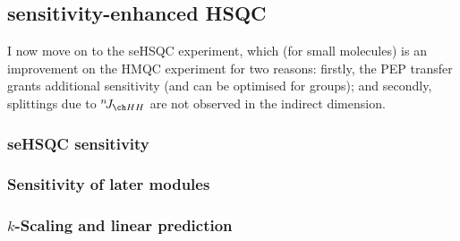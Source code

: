 \subsection{\texorpdfstring{\nitrogen{}}{15N} sensitivity-enhanced HSQC}
\label{subsec:noah__sehsqc_n}

I now move on to the \nitrogen{} seHSQC experiment, which (for small molecules) is an improvement on the HMQC experiment for two reasons: firstly, the PEP transfer grants additional sensitivity (and can be optimised for  groups); and secondly, splittings due to $\nJ{HH}$ are not observed in the indirect dimension.


\subsubsection{seHSQC sensitivity}



\subsubsection{Sensitivity of later modules}



\subsubsection{$k$-Scaling and linear prediction}

